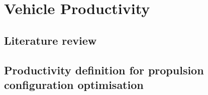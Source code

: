 \documentclass[ExampleMasters.tex]{subfiles}
\begin{document}
\chapter{Vehicle Productivity}
\lipsum

\section{Literature review}
\lipsum

\section{Productivity definition for propulsion configuration optimisation}
\lipsum
\end{document}
